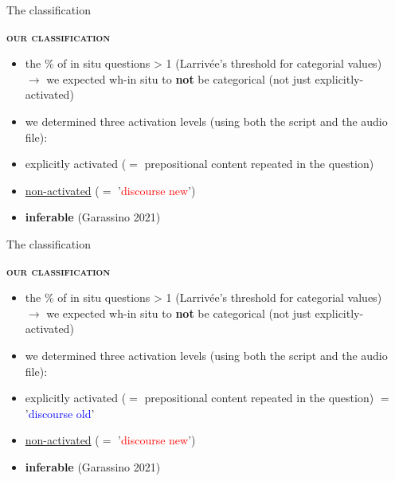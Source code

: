\documentclass[lesson_slides]{subfiles}
\begin{document}
\begin{frame}{The classification}

    \textbf{\textsc{our classification}}
    \begin{itemize}
        \item[\ding{227}] the \% of in situ questions > 1 (Larrivée's threshold for categorial values)\\ $\longrightarrow$ we expected wh-in situ to \textbf{not} be categorical (not just explicitly-activated)
        \item[\ding{227}] we determined three activation levels (using both the script and the audio file):
        \item[\ding{227}] explicitly activated ($=$ prepositional content repeated in the question)
        \item[\ding{227}] \underline{non-activated} ($=$ '\textcolor{red}{discourse new}')
        \item[\ding{227}] \textbf{inferable} (Garassino 2021)
            
    \end{itemize}

\end{frame}
\begin{frame}{The classification}

    \textbf{\textsc{our classification}}
    \begin{itemize}
        \item[\ding{227}] the \% of in situ questions > 1 (Larrivée's threshold for categorial values)\\ $\longrightarrow$ we expected wh-in situ to \textbf{not} be categorical (not just explicitly-activated)
        \item[\ding{227}] we determined three activation levels (using both the script and the audio file):
        \item[\ding{227}] explicitly activated ($=$ prepositional content repeated in the question) $=$ '\textcolor{blue}{discourse old}'
        \item[\ding{227}] \underline{non-activated} ($=$ '\textcolor{red}{discourse new}')
        \item[\ding{227}] \textbf{inferable} (Garassino 2021)
            
    \end{itemize}

\end{frame}
\end{document}
